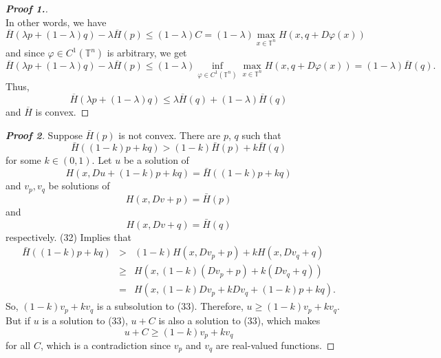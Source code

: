 \documentclass[12pt, oneside]{amsart}  	%
\begin{document}
\begin{proof}[\textbf{Proof 1.}]
\begin{equation*}
\end{equation*}
In other words, we have
\begin{equation*}
\overline{H}\left(\lambda p + (1-\lambda)q\right) - \lambda \overline{H}(p) \leq  (1-\lambda)C = (1-\lambda)\max_{x\in \mathbb{T}^n} H(x,q+D\varphi(x))
\end{equation*}
and since $\varphi\in C^1(\mathbb{T}^n)$ is arbitrary, we get
\begin{equation*}
\overline{H}\left(\lambda p + (1-\lambda)q\right) - \lambda \overline{H}(p)  \leq  (1-\lambda) \inf_{\varphi\in C^1(\mathbb{T}^n)} \max_{x\in \mathbb{T}^n} H(x,q+D\varphi(x)) = (1-\lambda)\overline{H}(q).
\end{equation*}
Thus,
\begin{equation*}
\overline{H}\left(\lambda p + (1-\lambda)q\right)  \leq \lambda \overline{H}(q) + (1-\lambda)\overline{H}(q)
\end{equation*}
and $\overline{H}$ is convex.
\end{proof}

\begin{proof}[\textbf{Proof 2}]
Suppose $\bar{H}(p)$ is not convex.  There are $p$, $q$ such that 
	\begin{equation}
		\bar{H}((1-k)p + kq) > (1-k)\bar{H}(p)+k\bar{H}(q)
	\end{equation}
	for some $k\in (0,1)$. Let $u$ be a solution of
	\begin{equation}
		H(x, Du + (1-k)p + kq) = \bar{H}((1-k)p + kq)
	\end{equation}
	and $v_p, v_q$ be solutions of
	$$H(x,Dv + p)= \bar{H}(p)$$
	and $$H(x,Dv + q)= \bar{H}(q)$$
	respectively.
	(32) Implies that 
	\begin{eqnarray*}
		\bar{H}((1-k)p + kq)	&>& 	(1-k)H(x,Dv_p + p)+ kH(x,Dv_q + q)\\
						&\ge&	H(x, (1-k)(Dv_p + p) + k(Dv_q +q)) \\
						&=&		H(x, (1-k)Dv_p+ kDv_q + (1-k)p +kq).
	\end{eqnarray*}
	So, $(1-k)v_p + kv_q$ is a subsolution to (33). Therefore, $u \ge (1-k)v_p + kv_q$. But if $u$ is a solution to (33), $u+C$ is also a solution to (33), which makes
	$$ u + C \ge (1-k)v_p + kv_q$$ for all $C$, which is a contradiction since $v_p$ and $v_q$ are real-valued functions.
\end{proof}

\nocite{*}


\end{document}
